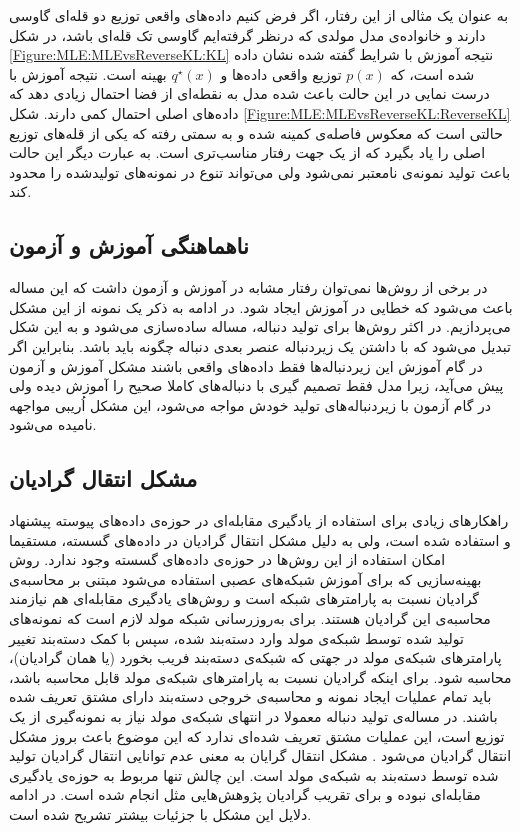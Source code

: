  \newline
 به عنوان یک مثالی از این رفتار، اگر فرض کنیم داده‌های واقعی توزیع دو قله‌ای گاوسی دارند و خانواده‌ی مدل مولدی که درنظر گرفته‌ایم گاوسی تک قله‌ای باشد، در شکل 
 \ref{Figure:MLE:MLEvsReverseKL:KL}
نتیجه آموزش با شرایط گفته شده نشان داده شده است، که 
 $p(x)$ 
 توزیع واقعی داده‌ها و
 $q^\star(x)$
 بهینه است. نتیجه آموزش با درست نمایی در این حالت باعث شده مدل به نقطه‌ای از فضا احتمال زیادی دهد که داده‌های اصلی احتمال کمی دارند. شکل 
 \ref{Figure:MLE:MLEvsReverseKL:ReverseKL}
 حالتی است که معکوس فاصله‌ی
 کمینه شده و به سمتی رفته که یکی از قله‌های توزیع اصلی را یاد بگیرد که از یک جهت رفتار مناسب‌تری است. به عبارت دیگر این حالت باعث تولید نمونه‌ی نامعتبر نمی‌شود ولی می‌تواند تنوع در نمونه‌های تولیدشده را محدود کند.
\subsection{ناهماهنگی آموزش و آزمون}\label{sec1:exposurebias}
در برخی از روش‌ها نمی‌توان رفتار مشابه در آموزش و آزمون داشت که این مساله باعث می‌شود که خطایی در آموزش ایجاد شود. در ادامه به ذکر یک نمونه از این مشکل می‌پردازیم.
\newline
در اکثر روش‌ها برای تولید دنباله، مساله ساده‌سازی می‌شود و به این شکل تبدیل می‌شود که با داشتن یک زیردنباله عنصر بعدی دنباله چگونه باید باشد. 
بنابراین اگر در گام آموزش این زیردنباله‌ها فقط داده‌های واقعی باشند مشکل 
آموزش و آزمون پیش می‌آید، زیرا مدل فقط تصمیم گیری با دنباله‌های کاملا صحیح را آموزش دیده ولی در گام آزمون با زیردنباله‌های تولید خودش مواجه می‌شود، این مشکل اُریبی مواجهه نامیده می‌شود.
\subsection{مشکل انتقال گرادیان } \label{Problem:GradientPass}
راهکارهای زیادی برای استفاده از یادگیری مقابله‌ای در حوزه‌ی داده‌های پیوسته پیشنهاد و استفاده شده است، ولی به دلیل مشکل انتقال گرادیان در داده‌های گسسته، مستقیما امکان استفاده از این روش‌ها در حوزه‌ی داده‌های گسسته وجود ندارد.
\newline
روش بهینه‌سازیی که برای آموزش شبکه‌های عصبی استفاده می‌شود مبتنی بر محاسبه‌ی گرادیان نسبت به پارامترهای شبکه است و روش‌های یادگیری مقابله‌ای هم نیازمند محاسبه‌ی این گرادیان هستند.
برای به‌روز‌رسانی شبکه مولد لازم است که نمونه‌‌های تولید شده توسط شبکه‌ی مولد وارد دسته‌بند شده، سپس با کمک دسته‌بند تغییر پارامتر‌های شبکه‌ی مولد در جهتی که شبکه‌ی دسته‌بند فریب بخورد (یا همان گرادیان)، محاسبه ‌شود. 
برای اینکه گرادیان نسبت به پارامتر‌های شبکه‌ی مولد قابل محاسبه باشد، باید تمام عملیات ایجاد نمونه و محاسبه‌ی خروجی دسته‌بند دارای مشتق تعریف شده باشند.
\newline
در مساله‌ی تولید دنباله معمولا در انتهای شبکه‌ی مولد نیاز به نمونه‌گیری از یک توزیع است، این عملیات مشتق تعریف شده‌ای ندارد که این موضوع باعث بروز مشکل انتقال گرادیان می‌شود
\cite{SeqGAN}.
مشکل انتقال گرایان به معنی عدم توانایی انتقال گرادیان تولید شده توسط دسته‌بند به شبکه‌ی مولد است.
این چالش تنها مربوط به حوزه‌ی یادگیری مقابله‌ای نبوده و برای تقریب گرادیان پژوهش‌هایی مثل
\cite{JanGuPoo17}
انجام شده است.
در ادامه دلایل این مشکل با جزئیات بیشتر تشریح شده است.
